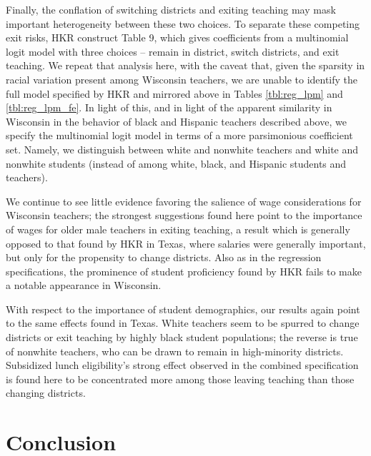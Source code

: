 \documentclass[]{article}
\begin{document}
Finally, the conflation of switching districts and exiting teaching may
mask important heterogeneity between these two choices. To separate
these competing exit risks, HKR construct Table 9, which gives
coefficients from a multinomial logit model with three choices -- remain
in district, switch districts, and exit teaching. We repeat that
analysis here, with the caveat that, given the sparsity in racial
variation present among Wisconsin teachers, we are unable to identify
the full model specified by HKR and mirrored above in Tables
\ref{tbl:reg_lpm} and \ref{tbl:reg_lpm_fe}. In light of this, and in
light of the apparent similarity in Wisconsin in the behavior of black
and Hispanic teachers described above, we specify the multinomial logit
model in terms of a more parsimonious coefficient set. Namely, we
distinguish between white and nonwhite teachers and white and nonwhite
students (instead of among white, black, and Hispanic students and
teachers).

We continue to see little evidence favoring the salience of wage
considerations for Wisconsin teachers; the strongest suggestions found
here point to the importance of wages for older male teachers in exiting
teaching, a result which is generally opposed to that found by HKR in
Texas, where salaries were generally important, but only for the
propensity to change districts. Also as in the regression
specifications, the prominence of student proficiency found by HKR fails
to make a notable appearance in Wisconsin.

With respect to the importance of student demographics, our results
again point to the same effects found in Texas. White teachers seem to
be spurred to change districts or exit teaching by highly black student
populations; the reverse is true of nonwhite teachers, who can be drawn
to remain in high-minority districts. Subsidized lunch eligibility's
strong effect observed in the combined specification is found here to be
concentrated more among those leaving teaching than those changing
districts.

\section{Conclusion}\label{conclusion}
\end{document}
